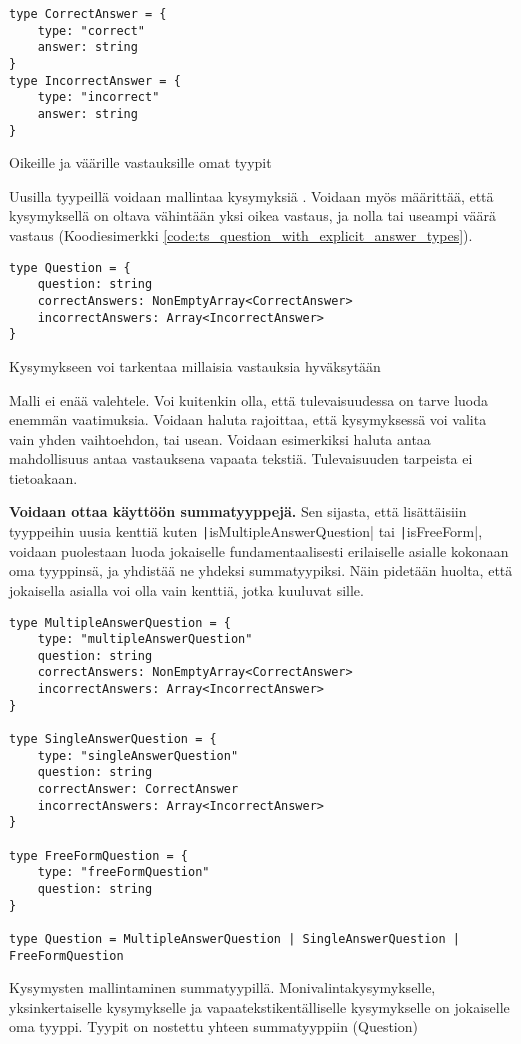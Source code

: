 \begin{code}
    \begin{verbatim}
type CorrectAnswer = {
    type: "correct"
    answer: string
}
type IncorrectAnswer = {
    type: "incorrect"
    answer: string
}
    \end{verbatim}
    \caption{Oikeille ja väärille vastauksille omat tyypit}
    \label{code:ts_answer_types}
\end{code}

Uusilla tyypeillä voidaan mallintaa kysymyksiä . Voidaan myös määrittää, että kysymyksellä on oltava vähintään yksi oikea vastaus, ja nolla tai useampi väärä vastaus (Koodiesimerkki \ref{code:ts_question_with_explicit_answer_types}).

\begin{code}
    \begin{verbatim}
type Question = {
    question: string
    correctAnswers: NonEmptyArray<CorrectAnswer>
    incorrectAnswers: Array<IncorrectAnswer>
}
    \end{verbatim}
    \caption{Kysymykseen voi tarkentaa millaisia vastauksia hyväksytään}
    \label{code:ts_question_with_explicit_answer_types}
\end{code}

Malli ei enää valehtele. Voi kuitenkin olla, että tulevaisuudessa on tarve luoda enemmän vaatimuksia. Voidaan haluta rajoittaa, että kysymyksessä voi valita vain yhden vaihtoehdon, tai usean. Voidaan esimerkiksi haluta antaa mahdollisuus antaa vastauksena vapaata tekstiä. Tulevaisuuden tarpeista ei tietoakaan.

\textbf{Voidaan ottaa käyttöön summatyyppejä.} Sen sijasta, että lisättäisiin tyyppeihin uusia kenttiä kuten \texttt|isMultipleAnswerQuestion| tai \texttt|isFreeForm|, voidaan puolestaan luoda jokaiselle fundamentaalisesti erilaiselle asialle kokonaan oma tyyppinsä, ja yhdistää ne yhdeksi summatyypiksi. Näin pidetään huolta, että jokaisella asialla voi olla vain kenttiä, jotka kuuluvat sille.

\begin{code}
    \begin{verbatim}
type MultipleAnswerQuestion = {
    type: "multipleAnswerQuestion"
    question: string
    correctAnswers: NonEmptyArray<CorrectAnswer>
    incorrectAnswers: Array<IncorrectAnswer>
}

type SingleAnswerQuestion = {
    type: "singleAnswerQuestion"
    question: string
    correctAnswer: CorrectAnswer
    incorrectAnswers: Array<IncorrectAnswer>
}

type FreeFormQuestion = {
    type: "freeFormQuestion"
    question: string
}

type Question = MultipleAnswerQuestion | SingleAnswerQuestion | FreeFormQuestion
    \end{verbatim}
    \caption{Kysymysten mallintaminen summatyypillä. Monivalintakysymykselle, yksinkertaiselle kysymykselle ja vapaatekstikentälliselle kysymykselle on jokaiselle oma tyyppi. Tyypit on nostettu yhteen summatyyppiin (Question)}
    \label{code:ts_sum_type_nice}
\end{code}

